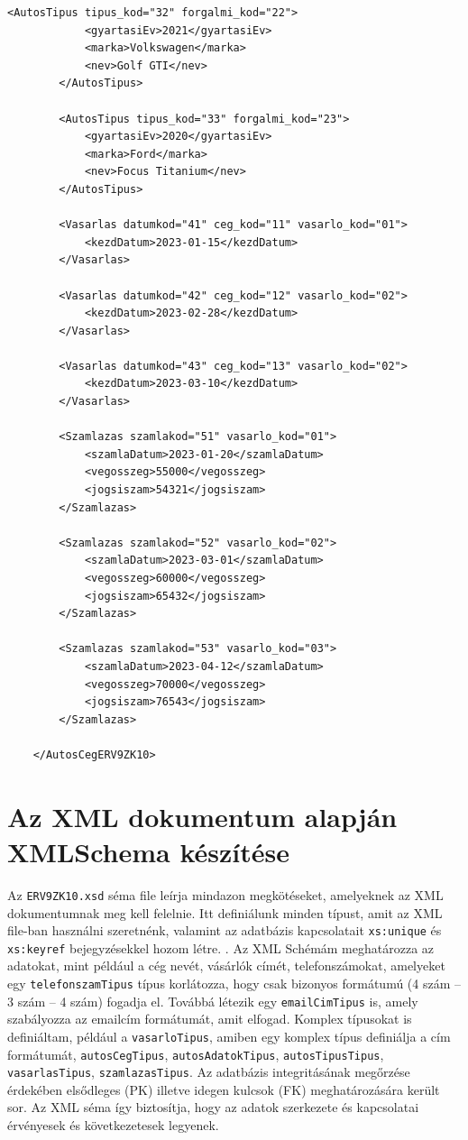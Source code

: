 \documentclass[12pt]{report}
\begin{document}
\begin{lstlisting}[caption={Az XML dokumentum}]
		<AutosTipus tipus_kod="32" forgalmi_kod="22">
			<gyartasiEv>2021</gyartasiEv>
			<marka>Volkswagen</marka>
			<nev>Golf GTI</nev>
		</AutosTipus>
	
		<AutosTipus tipus_kod="33" forgalmi_kod="23">
			<gyartasiEv>2020</gyartasiEv>
			<marka>Ford</marka>
			<nev>Focus Titanium</nev>
		</AutosTipus>
	
		<Vasarlas datumkod="41" ceg_kod="11" vasarlo_kod="01">
			<kezdDatum>2023-01-15</kezdDatum>
		</Vasarlas>
	
		<Vasarlas datumkod="42" ceg_kod="12" vasarlo_kod="02">
			<kezdDatum>2023-02-28</kezdDatum>
		</Vasarlas>
	
		<Vasarlas datumkod="43" ceg_kod="13" vasarlo_kod="02">
			<kezdDatum>2023-03-10</kezdDatum>
		</Vasarlas>
	
		<Szamlazas szamlakod="51" vasarlo_kod="01">
			<szamlaDatum>2023-01-20</szamlaDatum>
			<vegosszeg>55000</vegosszeg>
			<jogsiszam>54321</jogsiszam>
		</Szamlazas>
	
		<Szamlazas szamlakod="52" vasarlo_kod="02">
			<szamlaDatum>2023-03-01</szamlaDatum>
			<vegosszeg>60000</vegosszeg>
			<jogsiszam>65432</jogsiszam>
		</Szamlazas>
	
		<Szamlazas szamlakod="53" vasarlo_kod="03">
			<szamlaDatum>2023-04-12</szamlaDatum>
			<vegosszeg>70000</vegosszeg>
			<jogsiszam>76543</jogsiszam>
		</Szamlazas>
	
	</AutosCegERV9ZK10>
\end{lstlisting}
\clearpage

\section{Az XML dokumentum alapján XMLSchema készítése}
\indent\indent Az \texttt{ERV9ZK10.xsd} séma file leírja mindazon megkötéseket, amelyeknek az XML dokumentumnak meg kell felelnie. Itt definiálunk minden típust, amit az XML file-ban használni szeretnénk, valamint az adatbázis kapcsolatait \texttt{xs:unique} és \texttt{xs:keyref} bejegyzésekkel hozom létre. . Az XML Schémám meghatározza az adatokat, mint például a cég nevét, vásárlók címét, telefonszámokat, amelyeket egy \texttt{telefonszamTipus} típus korlátozza, hogy csak bizonyos formátumú (4 szám – 3 szám – 4 szám) fogadja el. Továbbá létezik egy \texttt{emailCimTipus} is, amely szabályozza az emailcím formátumát, amit elfogad. Komplex típusokat is definiáltam, például a \texttt{vasarloTipus}, amiben egy komplex típus definiálja a cím formátumát, \texttt{autosCegTipus}, \texttt{autosAdatokTipus}, \texttt{autosTipusTipus}, \texttt{vasarlasTipus}, \texttt{szamlazasTipus}. Az adatbázis integritásának megőrzése érdekében elsődleges (PK) illetve idegen kulcsok (FK) meghatározására került sor. Az XML séma így biztosítja, hogy az adatok szerkezete és kapcsolatai érvényesek és következetesek legyenek.
\end{document}
